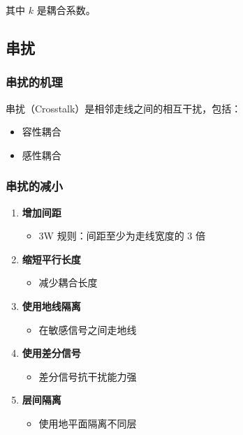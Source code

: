 其中 $k$ 是耦合系数。

\subsection{串扰}

\subsubsection{串扰的机理}

串扰（Crosstalk）是相邻走线之间的相互干扰，包括：
\begin{itemize}
  \item 容性耦合
  \item 感性耦合
\end{itemize}

\subsubsection{串扰的减小}

\begin{enumerate}
  \item \textbf{增加间距}
    \begin{itemize}
      \item 3W 规则：间距至少为走线宽度的 3 倍
    \end{itemize}

  \item \textbf{缩短平行长度}
    \begin{itemize}
      \item 减少耦合长度
    \end{itemize}

  \item \textbf{使用地线隔离}
    \begin{itemize}
      \item 在敏感信号之间走地线
    \end{itemize}

  \item \textbf{使用差分信号}
    \begin{itemize}
      \item 差分信号抗干扰能力强
    \end{itemize}

  \item \textbf{层间隔离}
    \begin{itemize}
      \item 使用地平面隔离不同层
    \end{itemize}
\end{enumerate}

